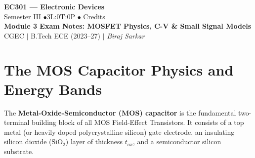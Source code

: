\documentclass[12pt,a4paper]{article}
\begin{document}

\begin{center}
  {\LARGE\bfseries\color{myred} EC301 --- Electronic Devices}\\[5pt]
  {\normalsize\color{mydark} Semester III \quad$\bullet$\quad 3L:0T:0P \quad$\bullet$ Credits}\\[3pt]
  {\normalsize\color{myteal}\textbf{Module 3 Exam Notes: MOSFET Physics, C-V \& Small Signal Models}}\\[3pt]
  {\small\color{mydark} CGEC \;$|$\; B.Tech ECE (2023--27) \;$|$\; \textit{Biraj Sarkar}}
\end{center}
\vspace{2pt}
\noindent{\color{myred}\rule{\linewidth}{1.5pt}}
\vspace{2pt}

\hypersetup{linkcolor=mydark}
\tableofcontents
\hypersetup{linkcolor=myteal}
\newpage

\section{The MOS Capacitor Physics and Energy Bands}

The \textbf{Metal-Oxide-Semiconductor (MOS) capacitor} is the fundamental two-terminal building block of all MOS Field-Effect Transistors. It consists of a top metal (or heavily doped polycrystalline silicon) gate electrode, an insulating silicon dioxide ($\text{SiO}_2$) layer of thickness $t_{ox}$, and a semiconductor silicon substrate.
\end{document}
